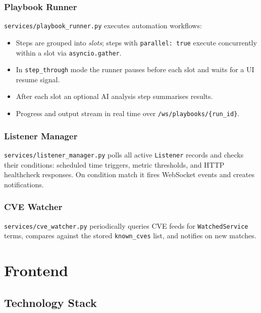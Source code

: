 \documentclass[11pt,a4paper,twoside,openright]{book}
\begin{document}
\subsection{Playbook Runner}

\texttt{services/playbook\_runner.py} executes automation workflows:

\begin{itemize}[leftmargin=*,noitemsep]
  \item Steps are grouped into \emph{slots}; steps with \texttt{parallel: true} execute concurrently within a slot via \texttt{asyncio.gather}.
  \item In \texttt{step\_through} mode the runner pauses before each slot and waits for a UI resume signal.
  \item After each slot an optional AI analysis step summarises results.
  \item Progress and output stream in real time over \texttt{/ws/playbooks/\{run\_id\}}.
\end{itemize}

\subsection{Listener Manager}

\texttt{services/listener\_manager.py} polls all active \texttt{Listener} records and checks their conditions: scheduled time triggers, metric thresholds, and HTTP healthcheck responses. On condition match it fires WebSocket events and creates notifications.

\subsection{CVE Watcher}

\texttt{services/cve\_watcher.py} periodically queries CVE feeds for \texttt{WatchedService} terms, compares against the stored \texttt{known\_cves} list, and notifies on new matches.

\chapter{Frontend}

\section{Technology Stack}
\end{document}
